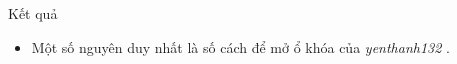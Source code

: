 Kết quả
\begin{itemize}
	\item Một số nguyên duy nhất là số cách để mở ổ khóa của \emph{ yenthanh132 } .
\end{itemize}